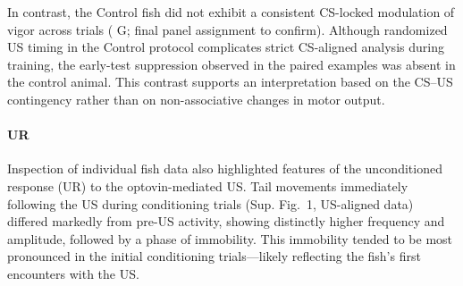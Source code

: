 In contrast, the Control fish did not exhibit a consistent CS-locked modulation of vigor across trials ( G; final panel assignment to confirm). Although randomized US timing in the Control protocol complicates strict CS-aligned analysis during training, the early-test suppression observed in the paired examples was absent in the control animal. This contrast supports an interpretation based on the CS--US contingency rather than on non-associative changes in motor output.


\paragraph{UR}
Inspection of individual fish data also highlighted features of the unconditioned response (UR) to the optovin-mediated US.
Tail movements immediately following the US during conditioning trials (Sup. Fig.~1, US-aligned data) differed markedly from pre-US activity, showing distinctly higher frequency and amplitude, followed by a phase of immobility. This immobility tended to be most pronounced in the initial conditioning trials---likely reflecting the fish's first encounters with the US.


